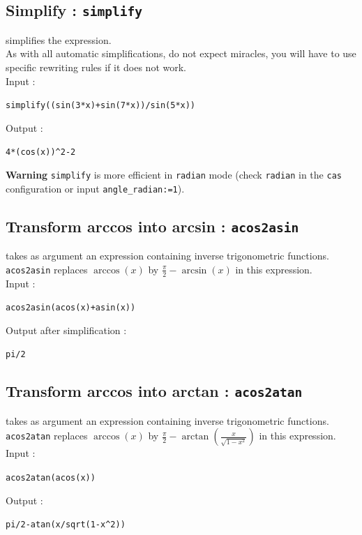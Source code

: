 \documentclass[a4paper,11pt]{book}
\begin{document}
\subsection{Simplify : {\tt simplify}}
 simplifies the expression.\\
As with all automatic simplifications, do not expect miracles,
you will have to use specific rewriting rules if it does not work.\\ 
Input :
\begin{center}{\tt simplify((sin(3*x)+sin(7*x))/sin(5*x))}\end{center}
Output :
\begin{center}{\tt 4*(cos(x))\verb|^|2-2}\end{center}
{\bf Warning} {\tt simplify} is more efficient in {\tt radian} mode (check 
{\tt radian} in the {\tt cas} configuration 
  or  input {\tt angle\_radian:=1}).

\subsection{Transform arccos into arcsin : {\tt acos2asin}}
 takes as argument an expression containing 
inverse trigonometric functions.\\
{\tt acos2asin}  replaces $\arccos(x)$ by 
$\displaystyle \frac{\pi}{2}-\arcsin(x)$ in this expression.\\
Input :
\begin{center}{\tt acos2asin(acos(x)+asin(x))}\end{center}
Output after simplification :
\begin{center}{\tt pi/2}\end{center}

\subsection{Transform arccos into arctan : {\tt acos2atan}}
 takes as argument an expression containing 
inverse trigonometric functions.\\
{\tt acos2atan}  replaces $\arccos(x)$ by
$\displaystyle \frac{\pi}{2}-\arctan(\frac{x}{\sqrt{1-x^2}})$ in this 
expression.\\
Input :
\begin{center}{\tt acos2atan(acos(x))}\end{center}
Output :
\begin{center}{\tt  pi/2-atan(x/sqrt(1-x\verb|^|2))}\end{center}
\end{document}
